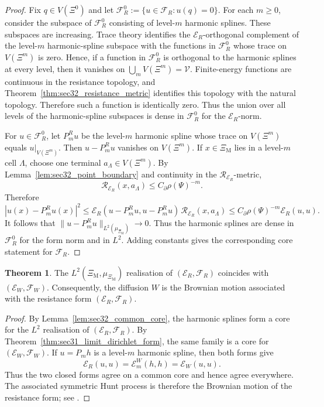 \documentclass{article}
\theoremstyle{plain}
\theoremstyle{definition}
\newtheorem{theorem}{Theorem}[section]
\newcommand{\Reff}{\mathscr{R}}
\begin{document}
\begin{proof}
Fix $q\in V(\Xi^0)$ and let $\mathcal F_R^0:=\{u\in\mathcal F_R:u(q)=0\}$.
For each $m\ge 0$, consider the subspace of $\mathcal F_R^0$ consisting of level-$m$ harmonic splines.
These subspaces are increasing.
Trace theory identifies the $\mathcal E_R$-orthogonal complement of the level-$m$ harmonic-spline subspace with the functions in $\mathcal F_R^0$ whose trace on $V(\Xi^m)$ is zero.
Hence, if a function in $\mathcal F_R^0$ is orthogonal to the harmonic splines at every level, then it vanishes on $\bigcup_m V(\Xi^m)=\mathscr V$.
Finite-energy functions are continuous in the resistance topology, and Theorem~\ref{thm:sec32_resistance_metric} identifies this topology with the natural topology.
Therefore such a function is identically zero.
Thus the union over all levels of the harmonic-spline subspaces is dense in $\mathcal F_R^0$ for the $\mathcal E_R$-norm.

For $u\in\mathcal F_R^0$, let $P_m^Ru$ be the level-$m$ harmonic spline whose trace on $V(\Xi^m)$ equals $u|_{V(\Xi^m)}$.
Then $u-P_m^Ru$ vanishes on $V(\Xi^m)$.
If $x\in\Xi_{\mathrm M}$ lies in a level-$m$ cell $\Lambda$, choose one terminal $a_{\Lambda}\in V(\Xi^m)$.
By Lemma~\ref{lem:sec32_point_boundary} and continuity in the $\Reff_{\mathcal E_R}$-metric,
\[
\Reff_{\mathcal E_R}(x,a_{\Lambda})\le C_\partial\rho(\Psi)^{-m}.
\]
Therefore
\[
|u(x)-P_m^Ru(x)|^2
\le
\mathcal E_R(u-P_m^Ru,u-P_m^Ru)\,\Reff_{\mathcal E_R}(x,a_{\Lambda})
\le
C_\partial\rho(\Psi)^{-m}\mathcal E_R(u,u).
\]
It follows that $\|u-P_m^Ru\|_{L^2(\mu_{\Xi_{\mathrm M}})}\to 0$.
Thus the harmonic splines are dense in $\mathcal F_R^0$ for the form norm and in $L^2$.
Adding constants gives the corresponding core statement for $\mathcal F_R$.
\end{proof}

\begin{theorem}\label{thm:sec32_brownian_motion}
The $L^2(\Xi_{\mathrm M},\mu_{\Xi_{\mathrm M}})$ realisation of $(\mathcal E_R,\mathcal F_R)$ coincides with $(\mathcal E_W,\mathcal F_W)$.
Consequently, the diffusion $W$ is the Brownian motion associated with the resistance form $(\mathcal E_R,\mathcal F_R)$.
\end{theorem}

\begin{proof}
By Lemma~\ref{lem:sec32_common_core}, the harmonic splines form a core for the $L^2$ realisation of $(\mathcal E_R,\mathcal F_R)$.
By Theorem~\ref{thm:sec31_limit_dirichlet_form}, the same family is a core for $(\mathcal E_W,\mathcal F_W)$.
If $u=P_mh$ is a level-$m$ harmonic spline, then both forms give
\[
\mathcal E_R(u,u)=\mathcal E_m^W(h,h)=\mathcal E_W(u,u).
\]
Thus the two closed forms agree on a common core and hence agree everywhere.
The associated symmetric Hunt process is therefore the Brownian motion of the resistance form; see \cite{kigami2001analysis,fukushima1994dirichlet}.
\end{proof}
\end{document}
